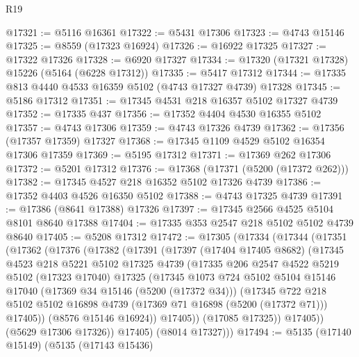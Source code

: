 \begin{lexlean}{R19}
\begin{coremodule}
{{{{{{{{{{{@17321 := @5116 @16361
@17322 := @5431 @17306
@17323 := @4743 @15146
@17325 := @8559 (@17323 @16924)
@17326 := @16922 @17325
@17327 := @17322 @17326
@17328 := @6920 @17327
@17334 := @17320 (@17321 @17328) @15226 (@5164 (@6228 @17312))
@17335 := @5417 @17312
@17344 := @17335 @813 @4440 @4533 @16359 @5102 (@4743 @17327 @4739) @17328
@17345 := @5186 @17312
@17351 := @17345 @4531 @218 @16357 @5102 @17327 @4739
@17352 := @17335 @437
@17356 := @17352 @4404 @4530 @16355 @5102
@17357 := @4743 @17306
@17359 := @4743 @17326 @4739
@17362 := @17356 (@17357 @17359) @17327
@17368 := @17345 @1109 @4529 @5102 @16354 @17306 @17359
@17369 := @5195 @17312
@17371 := @17369 @262 @17306
@17372 := @5201 @17312
@17376 := @17368 (@17371 (@5200 (@17372 @262)))
@17382 := @17345 @4527 @218 @16352 @5102 @17326 @4739
@17386 := @17352 @4403 @4526 @16350 @5102
@17388 := @4743 @17325 @4739
@17391 := @17386 (@8641 @17388) @17326
@17397 := @17345 @2566 @4525 @5104 @8101 @8640 @17388
@17404 := @17335 @353 @2547 @218 @5102 @5102 @4739 @8640
@17405 := @5208 @17312
@17472 := @17305
    (@17334
      (@17344
        (@17351
          (@17362
            (@17376
              (@17382
                (@17391
                  (@17397
                    (@17404 @17405 @8682)
                    (@17345
                      @4523
                      @218
                      @5221
                      @5102
                      @17325
                      @4739
                      (@17335
                        @206
                        @2547
                        @4522
                        @5219
                        @5102
                        (@17323 @17040)
                        @17325
                        (@17345
                          @1073
                          @724
                          @5102
                          @5104
                          @15146
                          @17040
                          (@17369 @34 @15146 (@5200 (@17372 @34)))
                          (@17345
                            @722
                            @218
                            @5102
                            @5102
                            @16898
                            @4739
                            (@17369 @71 @16898 (@5200 (@17372 @71)))
                            @17405))
                        (@8576 @15146 @16924))
                      @17405))
                  (@17085 @17325))
                @17405))
            (@5629 @17306 @17326))
          @17405)
        (@8014 @17327)))
@17494 := @5135
    (@17140 @15149)
    (@5135
      (@17143 @15436)
}}}}}}}}}}}
\end{coremodule}
\end{lexlean}

